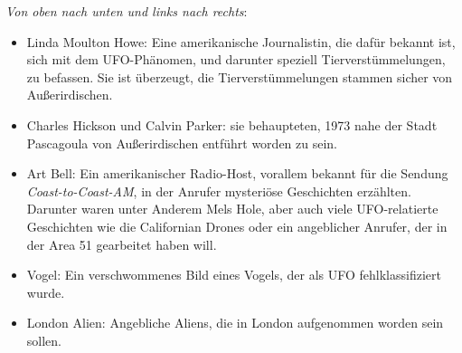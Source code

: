 \documentclass{scrartcl}
\begin{document}
\textit{Von oben nach unten und links nach rechts}:

\begin{itemize}
	\item Linda Moulton Howe: Eine amerikanische Journalistin, die dafür bekannt ist, sich mit dem UFO-Phänomen, und darunter speziell Tierverstümmelungen, zu befassen. Sie ist überzeugt, die Tierverstümmelungen stammen sicher von Außerirdischen. 
	\item Charles Hickson und Calvin Parker: sie behaupteten, 1973 nahe der Stadt Pascagoula von Außerirdischen entführt worden zu sein.
	\item Art Bell: Ein amerikanischer Radio-Host, vorallem bekannt für die Sendung \textit{Coast-to-Coast-AM}, in der Anrufer mysteriöse Geschichten erzählten. Darunter waren unter Anderem Mels Hole, aber auch viele UFO-relatierte Geschichten wie die Californian Drones oder ein angeblicher Anrufer, der in der Area 51 gearbeitet haben will.
	\item Vogel: Ein verschwommenes Bild eines Vogels, der als UFO fehlklassifiziert wurde.
	\item London Alien: Angebliche Aliens, die in London aufgenommen worden sein sollen.
\end{itemize}
\end{document}
